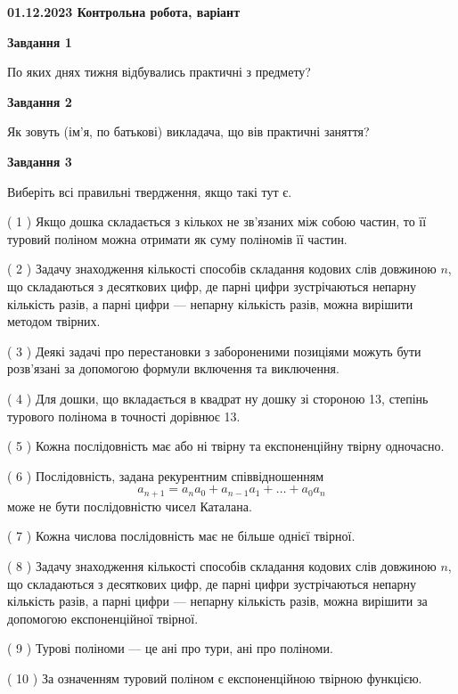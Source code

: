 \documentclass[12pt, ukrainian]{article}
\begin{document}
\begin {large}

\textbf{01.12.2023 Контрольна робота, варіант  }\par


{
{\begin {center}\textbf{Завдання 1}\end {center}}\par
По яких днях тижня відбувались практичні з предмету?\par
{\begin {center}\textbf{Завдання 2}\end {center}}\par
Як зовуть (ім'я, по батькові) викладача, що вів практичні заняття?\par
{\begin {center}\textbf{Завдання 3}\end {center}}\par
Виберіть всі правильні твердження, якщо такі тут є.\par
\vspace{2mm}
( 1 ) Якщо дошка складається з кількох не зв’язаних між собою частин, то її туровий поліном можна отримати як суму поліномів її частин.%

( 2 ) Задачу знаходження кількості способів складання кодових слів довжиною $n$, що складаються з десяткових цифр, де парні цифри зустрічаються непарну кількість разів, а парні цифри — непарну кількість разів, можна вирішити методом твірних.%

( 3 ) Деякі задачі про перестановки з забороненими позиціями можуть бути розв’я\-за\-ні за допомогою формули включення та виключення.%

( 4 ) Для дошки, що вкладається в квадрат ну дошку зі стороною 13, степінь турового полінома в точності дорівнює 13.%

( 5 ) Кожна послідовність має або ні твірну та експоненційну твірну одночасно.%

( 6 ) Послідовність, задана рекурентним співвідношенням $$a_{n+1}=a_{n}a_{0}+a_{n-1}a_{1}+\ldots+a_0a_{n}$$ може не бути послідовністю чисел Каталана.%

( 7 ) Кожна числова послідовність має не більше однієї твірної.%

( 8 ) Задачу знаходження кількості способів складання кодових слів довжиною $n$, що складаються з десяткових цифр, де парні цифри зустрічаються непарну кількість разів, а парні цифри — непарну кількість разів, можна вирішити за допомогою експоненційної твірної.%

( 9 ) Турові поліноми --- це ані про тури, ані про поліноми.%

( 10 ) За означенням туровий поліном є експоненційною твірною функцією.%
}
\end {large}

\vspace{4mm}
\newpage
\end{document}
